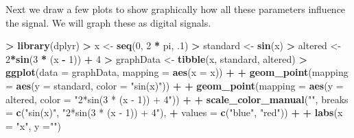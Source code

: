 \documentclass[
]{krantz}
\makeatletter
\newenvironment{Shaded}{\begin{snugshade}}{\end{snugshade}}
\newcommand{\DataTypeTok}[1]{\textcolor[rgb]{0.27,0.27,0.27}{#1}}
\newcommand{\DecValTok}[1]{\textcolor[rgb]{0.06,0.06,0.06}{#1}}
\newcommand{\FloatTok}[1]{\textcolor[rgb]{0.06,0.06,0.06}{#1}}
\newcommand{\KeywordTok}[1]{\textcolor[rgb]{0.27,0.27,0.27}{\textbf{#1}}}
\newcommand{\NormalTok}[1]{#1}
\newcommand{\OperatorTok}[1]{\textcolor[rgb]{0.43,0.43,0.43}{\textbf{#1}}}
\newcommand{\StringTok}[1]{\textcolor[rgb]{0.5,0.5,0.5}{#1}}
\newenvironment{kframe}{%
\medskip{}
\setlength{\fboxsep}{.8em}
 \def\at@end@of@kframe{}%
 \ifinner\ifhmode%
  \def\at@end@of@kframe{\end{minipage}}%
  \begin{minipage}{\columnwidth}%
 \fi\fi%
 \def\FrameCommand##1{\hskip\@totalleftmargin \hskip-\fboxsep
 \colorbox{shadecolor}{##1}\hskip-\fboxsep
     \hskip-\linewidth \hskip-\@totalleftmargin \hskip\columnwidth}%
 \MakeFramed {\advance\hsize-\width
   \@totalleftmargin\z@ \linewidth\hsize
   \@setminipage}}%
 {\par\unskip\endMakeFramed%
 \at@end@of@kframe}
\renewenvironment{Shaded}{\begin{kframe}}{\end{kframe}}
\makeatother
\begin{document}
Next we draw a few plots to show graphically how all these parameters influence the signal. We will graph these as digital signals.

\begin{Shaded}
\begin{Highlighting}[]
\OperatorTok{\textgreater{}}\StringTok{ }\KeywordTok{library}\NormalTok{(dplyr)}
\OperatorTok{\textgreater{}}\StringTok{ }\NormalTok{x \textless{}{-}}\StringTok{ }\KeywordTok{seq}\NormalTok{(}\DecValTok{0}\NormalTok{, }\DecValTok{2} \OperatorTok{*}\StringTok{ }\NormalTok{pi, }\FloatTok{.1}\NormalTok{)}
\OperatorTok{\textgreater{}}\StringTok{ }\NormalTok{standard \textless{}{-}}\StringTok{ }\KeywordTok{sin}\NormalTok{(x)}
\OperatorTok{\textgreater{}}\StringTok{ }\NormalTok{altered \textless{}{-}}\StringTok{ }\DecValTok{2}\OperatorTok{*}\KeywordTok{sin}\NormalTok{(}\DecValTok{3} \OperatorTok{*}\StringTok{ }\NormalTok{(x }\OperatorTok{{-}}\StringTok{ }\DecValTok{1}\NormalTok{)) }\OperatorTok{+}\StringTok{ }\DecValTok{4}
\OperatorTok{\textgreater{}}\StringTok{ }\NormalTok{graphData \textless{}{-}}\StringTok{ }\KeywordTok{tibble}\NormalTok{(x, standard, altered)}
\OperatorTok{\textgreater{}}\StringTok{ }\KeywordTok{ggplot}\NormalTok{(}\DataTypeTok{data =}\NormalTok{ graphData, }\DataTypeTok{mapping =} \KeywordTok{aes}\NormalTok{(}\DataTypeTok{x =}\NormalTok{ x)) }\OperatorTok{+}\StringTok{ }
\OperatorTok{+}\StringTok{   }\KeywordTok{geom\_point}\NormalTok{(}\DataTypeTok{mapping =} \KeywordTok{aes}\NormalTok{(}\DataTypeTok{y =}\NormalTok{ standard, }\DataTypeTok{color =} \StringTok{"sin(x)"}\NormalTok{)) }\OperatorTok{+}\StringTok{ }
\OperatorTok{+}\StringTok{   }\KeywordTok{geom\_point}\NormalTok{(}\DataTypeTok{mapping =} \KeywordTok{aes}\NormalTok{(}\DataTypeTok{y =}\NormalTok{ altered, }\DataTypeTok{color =} \StringTok{"2*sin(3 * (x {-} 1)) + 4"}\NormalTok{)) }\OperatorTok{+}\StringTok{ }
\OperatorTok{+}\StringTok{   }\KeywordTok{scale\_color\_manual}\NormalTok{(}\StringTok{""}\NormalTok{, }\DataTypeTok{breaks =} \KeywordTok{c}\NormalTok{(}\StringTok{"sin(x)"}\NormalTok{, }\StringTok{"2*sin(3 * (x {-} 1)) + 4"}\NormalTok{), }
\OperatorTok{+}\StringTok{                      }\DataTypeTok{values =} \KeywordTok{c}\NormalTok{(}\StringTok{"blue"}\NormalTok{, }\StringTok{"red"}\NormalTok{)) }\OperatorTok{+}\StringTok{ }
\OperatorTok{+}\StringTok{   }\KeywordTok{labs}\NormalTok{(}\DataTypeTok{x =} \StringTok{"x"}\NormalTok{, }\DataTypeTok{y =}\StringTok{""}\NormalTok{)}
\end{Highlighting}
\end{Shaded}
\end{document}
